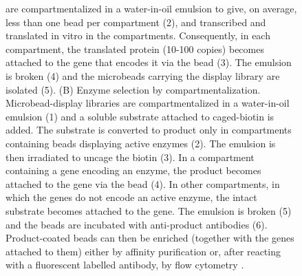 \begin{refsection}
\begin{figure}[htbp]
{    are compartmentalized in a water-in-oil emulsion to give, on average, less
    than one bead per compartment (2), and transcribed and translated in vitro
    in the compartments. Consequently, in each compartment, the translated
    protein (10-100 copies) becomes attached to the gene that encodes it via
    the bead (3).  The emulsion is broken (4) and the microbeads carrying the
    display library are isolated (5). (B) Enzyme selection by
    compartmentalization.  Microbead-display libraries are compartmentalized in
    a water-in-oil emulsion (1) and a soluble substrate attached to
    caged-biotin is added. The substrate is converted to product only in
    compartments containing beads displaying active enzymes (2). The emulsion
    is then irradiated to uncage the biotin (3). In a compartment containing a
    gene encoding an enzyme, the product becomes attached to the gene via the
    bead (4). In other compartments, in which the genes do not encode an active
    enzyme, the intact substrate becomes attached to the gene. The emulsion is
    broken (5) and the beads are incubated with anti-product antibodies (6).
    Product-coated beads can then be enriched (together with the genes attached
    to them) either by affinity purification or, after reacting with a
    fluorescent labelled antibody, by flow cytometry \cite{Griffiths2003c}.}
    \label{fig:ivc}
\end{figure}


\end{refsection}
